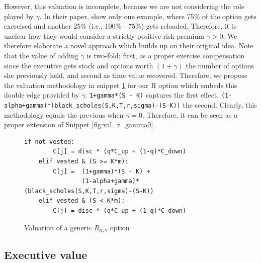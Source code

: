  

However, this valuation is incomplete, because we are not considering the role played by $\gamma$. In their paper, \cite{huang2013dynamic} show only one example, where 75\% of the option gets exercised and another 25\% (i.e., 100\% - 75\%) gets reloaded. Therefore, it is unclear how they would consider a strictly positive risk premium $\gamma > 0$. 
We therefore elaborate a novel approach which builds up on their original idea. Note that the value of adding $\gamma$ is two-fold: first, as a proper exercise compensation since the executive gets stock and options worth $(1+\gamma)$ the number of options she previously held, and second as time value recovered. Therefore, we propose the valuation methodology in snippet \ref*{fig:val_r} for our R option which embeds this double edge provided by $\gamma$: \verb|1+gamma*(S - K)| captures the first effect, \verb|(1-alpha+gamma)*(black_scholes(S,K,T,r,sigma)-(S-K))| the second.
Clearly, this methodology equals the previous when $\gamma = 0$. Therefore, it can be seen as a proper extension of Snippet \ref*{fig:val_r_gamma0}.

\begin{figure}[h]
    \begin{lstlisting}[breaklines, basicstyle=\ttfamily\small] 
    if not vested:                         
        C[j] = disc * (q*C_up + (1-q)*C_down)
    elif vested & (S >= K*m):                
        C[j] =  (1+gamma)*(S - K) + 
                (1-alpha+gamma)*(black_scholes(S,K,T,r,sigma)-(S-K))
    elif vested & (S < K*m):  
        C[j] = disc * (q*C_up + (1-q)*C_down)
    \end{lstlisting}
    \caption{Valuation of a generic $R_{\alpha, \gamma}$ option}
    \label{fig:val_r}
\end{figure}



\subsection{Executive value}


